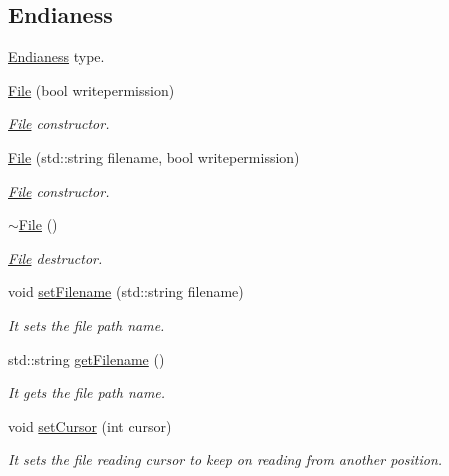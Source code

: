 \subsection*{Endianess}
\label{_amgrp68d1da2139a8ed4b55ce04f6cab103e1}%
\hyperlink{struct_file_1_1_endianess}{Endianess} type. \begin{DoxyCompactItemize}
\item 
\mbox{\label{class_file_a6d35be1dc4e39ee66afd1696d8426bd2}} 
\hyperlink{class_file_a6d35be1dc4e39ee66afd1696d8426bd2}{File} (bool writepermission)
\begin{DoxyCompactList}\small\item\em \hyperlink{class_file}{File} constructor. \end{DoxyCompactList}\item 
\hyperlink{class_file_a8fedf48254fb2b7087fe82369301f6e6}{File} (std\+::string filename, bool writepermission)
\begin{DoxyCompactList}\small\item\em \hyperlink{class_file}{File} constructor. \end{DoxyCompactList}\item 
\mbox{\label{class_file_ac704ebdf5f57d7a1c5ddf409d797fb69}} 
\hyperlink{class_file_ac704ebdf5f57d7a1c5ddf409d797fb69}{$\sim$\+File} ()
\begin{DoxyCompactList}\small\item\em \hyperlink{class_file}{File} destructor. \end{DoxyCompactList}\item 
void \hyperlink{class_file_a4fc5c5228613d30b136e5e9a0a046339}{set\+Filename} (std\+::string filename)
\begin{DoxyCompactList}\small\item\em It sets the file path name. \end{DoxyCompactList}\item 
std\+::string \hyperlink{class_file_aff78fc9f04aecc0a56c151a5f328944a}{get\+Filename} ()
\begin{DoxyCompactList}\small\item\em It gets the file path name. \end{DoxyCompactList}\item 
void \hyperlink{class_file_a3320ff9a60903cdae6eb7f3fff06b05c}{set\+Cursor} (int cursor)
\begin{DoxyCompactList}\small\item\em It sets the file reading cursor to keep on reading from another position. \end{DoxyCompactList}\item 

\end{DoxyCompactItemize}
